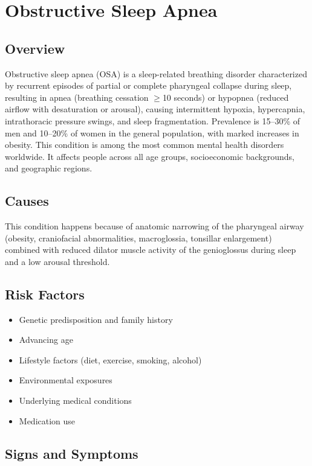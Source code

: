 \chapter{Obstructive Sleep Apnea}
\label{sec:Obstructive Sleep Apnea}

\section{Overview}
Obstructive sleep apnea (OSA) is a sleep-related breathing disorder characterized by recurrent episodes of partial or complete pharyngeal collapse during sleep, resulting in apnea (breathing cessation $\ge$10 seconds) or hypopnea (reduced airflow with desaturation or arousal), causing intermittent hypoxia, hypercapnia, intrathoracic pressure swings, and sleep fragmentation. Prevalence is 15--30\% of men and 10--20\% of women in the general population, with marked increases in obesity. This condition is among the most common mental health disorders worldwide. It affects people across all age groups, socioeconomic backgrounds, and geographic regions.
\section{Causes}
This condition happens because of anatomic narrowing of the pharyngeal airway (obesity, craniofacial abnormalities, macroglossia, tonsillar enlargement) combined with reduced dilator muscle activity of the genioglossus during sleep and a low arousal threshold.     
\section{Risk Factors}

\begin{itemize}[noitemsep]
  \item Genetic predisposition and family history
  \item Advancing age
  \item Lifestyle factors (diet, exercise, smoking, alcohol)
  \item Environmental exposures
  \item Underlying medical conditions
  \item Medication use
\end{itemize}
\section{Signs and Symptoms}

